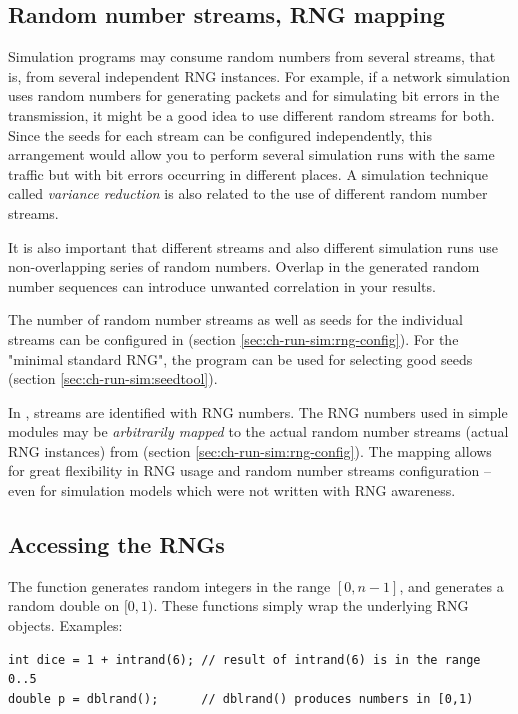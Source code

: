 \subsection{Random number streams, RNG mapping}

Simulation programs may consume random numbers from several streams,
that is, from several independent RNG instances. For example, if a
network simulation uses random numbers for generating packets and
for simulating bit errors in the transmission, it might be a good
idea to use different random streams for both. Since the seeds
for each stream can be configured independently, this arrangement
would allow you to perform several simulation runs with the same traffic
but with bit errors occurring in different places.
A simulation technique called \textit{variance reduction} is
also related to the use of different random number streams.

It is also important that different streams and also different
simulation runs use non-overlapping series of random numbers.
Overlap in the generated random number sequences can introduce
unwanted correlation in your results.

The number of random number streams as well as seeds for the individual
streams can be configured in 
(section \ref{sec:ch-run-sim:rng-config}).
For the "minimal standard RNG", the  program can be
used for selecting good seeds (section \ref{sec:ch-run-sim:seedtool}).

In {\opp}, streams are identified with RNG numbers. The RNG numbers
used in simple modules may be \textit{arbitrarily mapped} to the actual
random number streams (actual RNG instances) from 
(section \ref{sec:ch-run-sim:rng-config}). The mapping allows
for great flexibility in RNG usage and random number streams
configuration -- even for simulation models which were not written
with RNG awareness.


\subsection{Accessing the RNGs}

The  function generates random integers in the range $[0, n-1]$, and
 generates a random double on $[0,1)$. These functions
simply wrap the underlying RNG objects. Examples:

\begin{verbatim}
int dice = 1 + intrand(6); // result of intrand(6) is in the range 0..5
double p = dblrand();      // dblrand() produces numbers in [0,1)
\end{verbatim}


